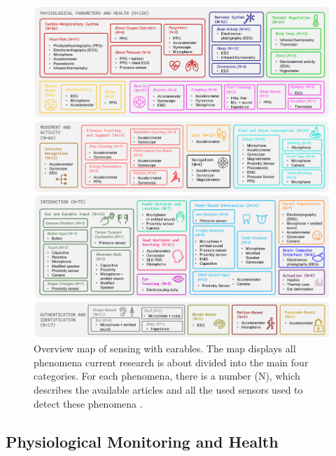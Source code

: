 \begin{figure}[t]
    \centering
    \includegraphics[scale=0.3525]{thesis-doc/images/sensing_with_earables_overview.png}
    \caption{Overview map of sensing with earables. The map displays all phenomena current research is about divided into the main four categories. For each phenomena, there is a number (N), which describes the available articles and all the used sensors used to detect these phenomena \cite{roddigerSensingEarablesSystematic2022a}.}
    \label{fig:sensing_with_earables_overview}
\end{figure}

\subsection{Physiological Monitoring and Health}
\label{Background:SensingWithEarables:Physiological}

